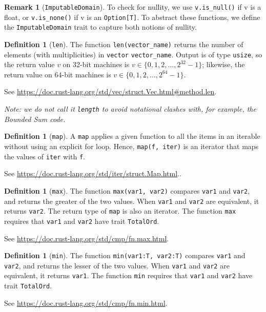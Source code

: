 \documentclass[11pt,a4paper]{article}
\theoremstyle{definition}
\newtheorem{remark}[theorem]{Remark}
\newtheorem{definition}[theorem]{Definition}
\newcommand{\inRust}[2]{See \url{#2}.}
\begin{document}
\begin{remark}[\texttt{ImputableDomain}]
To check for nullity, we use \texttt{v.is\_null()} if v is a float, or \texttt{v.is\_none()} if v is an \texttt{Option[T]}. To abstract these functions, we define the \texttt{ImputableDomain} trait to capture both notions of nullity.
\end{remark}

\begin{definition}[\texttt{len}]
    The function \texttt{len(vector\_name)} returns the number of elements (with multiplicities) in \texttt{vector} \texttt{vector\_name}. Output is of type \texttt{usize}, so the return value $v$ on 32-bit machines is $v\in \{0,1,2,\ldots,2^{32} - 1\}$; likewise, the return value on 64-bit machines is $v\in \{0,1,2,\ldots,2^{64} - 1\}$. 
    
    \inRust{std::vec::Vec::len}{https://doc.rust-lang.org/std/vec/struct.Vec.html\#method.len}
\end{definition}

\emph{Note: we do not call it \texttt{length} to avoid notational clashes with, for example, the Bounded Sum code.}

\begin{definition}[\texttt{map}]
    A \texttt{map} applies a given function to all the items in an iterable without using an explicit for loop. Hence, \texttt{map(f, iter)} is an iterator that maps the values of \texttt{iter} with \texttt{f}.
    
    \inRust{Struct std::iter::Map}{https://doc.rust-lang.org/std/iter/struct.Map.html}.
\end{definition}

\begin{definition}[\texttt{max}]
    The function \texttt{max(var1, var2)} compares \texttt{var1} and \texttt{var2}, and returns the greater of the two values. When \texttt{var1} and \texttt{var2} are equivalent, it returns \texttt{var2}. The return type of \texttt{map} is also an iterator. The function \texttt{max} requires that \texttt{var1} and \texttt{var2} have trait \texttt{TotalOrd}. 
    
    \inRust{std::cmp::max}{https://doc.rust-lang.org/std/cmp/fn.max.html}
\end{definition}

\begin{definition}[\texttt{min}]
    The function \texttt{min(var1:T, var2:T)} compares \texttt{var1} and \texttt{var2}, and returns the lesser of the two values. When \texttt{var1} and \texttt{var2} are equivalent, it returns \texttt{var1}. The function \texttt{min} requires that \texttt{var1} and \texttt{var2} have trait \texttt{TotalOrd}. 
    
    \inRust{std::cmp::min}{https://doc.rust-lang.org/std/cmp/fn.min.html}
\end{definition}
\end{document}
